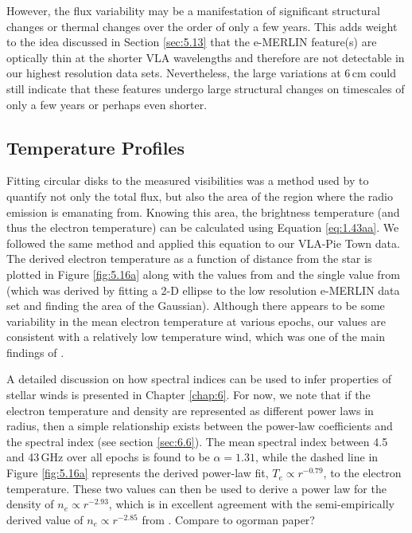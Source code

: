 \documentclass[iop]{emulateapj}
\begin{document}
However, the flux variability may be a manifestation of significant structural changes or thermal changes over the order of only a few years.  This adds weight to the idea discussed in Section \ref{sec:5.13} that the e-MERLIN feature(s) are optically thin at the shorter VLA wavelengths and therefore are not detectable in our highest resolution data sets. Nevertheless, the large variations at 6\,cm could still indicate that these features undergo large structural changes on timescales of only a few years or perhaps even shorter.

\subsection{Temperature Profiles}
Fitting circular disks to the measured visibilities was a method used by \cite{lim_1998} to quantify not only the total flux, but also the area of the region where the radio emission is emanating from. Knowing this area, the brightness temperature (and thus the electron temperature) can be calculated using Equation \ref{eq:1.43aa}. We followed the same method and applied this equation to our VLA-Pie Town data. The derived electron temperature as a function of distance from the star is plotted in Figure \ref{fig:5.16a} along with the values from \cite{lim_1998} and the single value from \cite{richards_2013} (which was derived by fitting a 2-D ellipse to the low resolution e-MERLIN data set and finding the area of the Gaussian). Although there appears to be some variability in the mean electron temperature at various epochs, our values are consistent with a relatively low temperature wind, which was one of the main findings of \cite{lim_1998}. 

A detailed discussion on how spectral indices can be used to infer properties of stellar winds is presented in Chapter \ref{chap:6}. For now, we note that if the electron temperature and density are represented as different power laws in radius, then a simple relationship  exists between the power-law coefficients and the spectral index (see section \ref{sec:6.6}). The mean spectral index between 4.5 and 43\,GHz over all epochs is found to be $\alpha =1.31$, while the dashed line in Figure \ref{fig:5.16a} represents the derived power-law fit, $T_{e} \propto r^{-0.79}$, to the electron temperature. These two values can then be used to derive a power law for the density of $n_{e} \propto r^{-2.93}$, which is in excellent agreement with the semi-empirically derived value of $n_{e} \propto r^{-2.85}$ from \cite{harper_2001}. Compare to ogorman paper?
\end{document}
